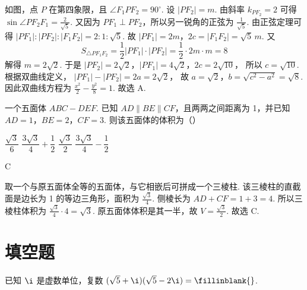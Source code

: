\begin{solution}
如图，点 \(P\) 在第四象限，且 \(\angle F_1PF_2=90^\circ\).
设 \(|PF_2|=m\). 由斜率 \(k_{PF_2}=2\) 可得
\(\sin\angle PF_2F_1=\frac{2}{\sqrt5}\).
又因为 \(PF_1\perp PF_2\)，所以另一锐角的正弦为
\(\frac{1}{\sqrt5}\).
由正弦定理可得
\(|PF_1|:|PF_2|:|F_1F_2|=2:1:\sqrt5\).
故
\(|PF_1|=2m\)，\(2c=|F_1F_2|=\sqrt5\,m\).
又
\[
S_{\triangle PF_1F_2}=\frac12|PF_1|\cdot |PF_2| =\frac12\cdot 2m\cdot m=8
\]
解得
\(m=2\sqrt2\).
于是
\(|PF_2|=2\sqrt2\)，\(|PF_1|=4\sqrt2\)，\(2c=2\sqrt{10}\)，
所以
\(c=\sqrt{10}\).
根据双曲线定义，
\(|PF_1|-|PF_2|=2a=2\sqrt2\)，
故
\(a=\sqrt2\)，\(b=\sqrt{c^2-a^2}=\sqrt8\).
因此双曲线方程为
\(\frac{x^2}{2}-\frac{y^2}{8}=1\).
故选 A.
\end{solution}

\begin{problem}
一个五面体 \(ABC-DEF\). 已知 \(AD\parallel BE\parallel CF\)，且两两之间距离为 1，并已知 \(AD=1\)，\(BE=2\)，\(CF=3\). 则该五面体的体积为（\quad）


\choices
    {\(\dfrac{\sqrt3}{6}\)}
    {\(\dfrac{3\sqrt3}{4}+\dfrac12\)}
    {\(\dfrac{\sqrt3}{2}\)}
    {\(\dfrac{3\sqrt3}{4}-\dfrac12\)}
\end{problem}

\begin{answer}
C
\end{answer}

\begin{solution}
取一个与原五面体全等的五面体，与它相嵌后可拼成一个三棱柱.
该三棱柱的直截面是边长为 1 的等边三角形，面积为
\(\frac{\sqrt3}{4}\).
侧棱长为
\(AD+CF=1+3=4\).
所以三棱柱体积为
\(\frac{\sqrt3}{4}\cdot 4=\sqrt3\).
原五面体体积是其一半，故
\(V=\frac{\sqrt3}{2}\).
故选 C.
\end{solution}
\section{填空题}

\begin{problem}
已知 \(\i\) 是虚数单位，复数 \((\sqrt5+\i)(\sqrt5-2\i)=\fillinblank{}\).
\end{problem}

